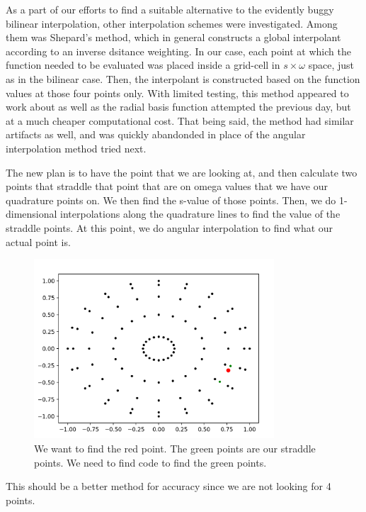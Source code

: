 \documentclass[12pt]{article}
\begin{document}
As a part of our efforts to find a suitable alternative to the evidently buggy bilinear interpolation, other interpolation schemes were investigated.
Among them was Shepard's method, which in general constructs a global interpolant according to an inverse dsitance weighting.
In our case, each point at which the function needed to be evaluated was placed inside a grid-cell in $s \times \omega$ space, just as in the bilinear case.
Then, the interpolant is constructed based on the function values at those four points only. 
With limited testing, this method appeared to work about as well as the radial basis function attempted the previous day, but at a much cheaper computational cost.
That being said, the method had similar artifacts as well, and was quickly abandonded in place of the angular interpolation method tried next.

The new plan is to have the point that we are looking at, and then calculate two points that straddle that point that are on omega values that we have our quadrature points on. We then find the s-value of those points. Then, we do 1-dimensional interpolations along the quadrature lines to find the value of the straddle points. At this point, we do angular interpolation to find what our actual point is. 

\begin{figure}[H]
\centering
\includegraphics[width=0.8\textwidth]{StraddlePoints.jpg}
\caption{We want to find the red point. The green points are our straddle points. We need to find code to find the green points.}
\end{figure}

This should be a better method for accuracy since we are not looking for 4 points. \\
\end{document}
